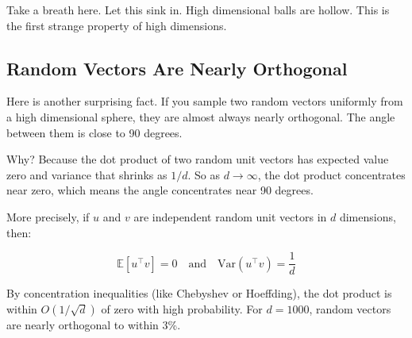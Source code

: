 \vspace{1.5em}

Take a breath here. Let this sink in. High dimensional balls are hollow. This is the first strange property of high dimensions.

\vspace{1.5em}

\subsection{Random Vectors Are Nearly Orthogonal}

Here is another surprising fact. If you sample two random vectors uniformly from a high dimensional sphere, they are almost always nearly orthogonal. The angle between them is close to 90 degrees.

Why? Because the dot product of two random unit vectors has expected value zero and variance that shrinks as $1/d$. So as $d \to \infty$, the dot product concentrates near zero, which means the angle concentrates near 90 degrees.

\vspace{1em}

More precisely, if $u$ and $v$ are independent random unit vectors in $d$ dimensions, then:

\begin{equation}
\mathbb{E}[u^\top v] = 0 \quad \text{and} \quad \text{Var}(u^\top v) = \frac{1}{d}
\end{equation}

By concentration inequalities (like Chebyshev or Hoeffding), the dot product is within $O(1/\sqrt{d})$ of zero with high probability. For $d = 1000$, random vectors are nearly orthogonal to within 3\%.

\vspace{1.5em}

